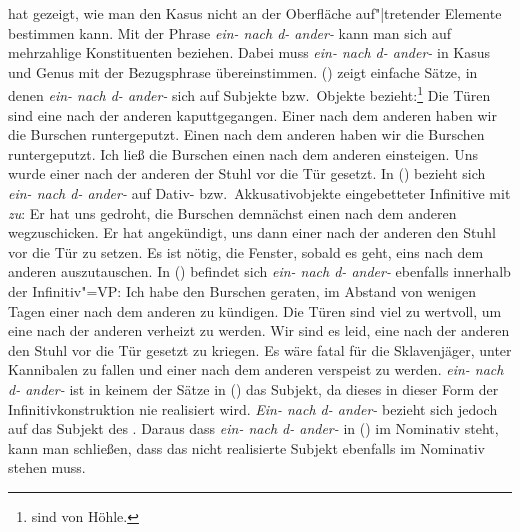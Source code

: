 \citet*[Kapitel~6]{Hoehle83a}
hat gezeigt, wie man den Kasus nicht an der Oberfläche
auf"|tretender Elemente bestimmen kann. Mit der Phrase \emph{ein- nach d- ander-} kann
man sich auf mehrzahlige Konstituenten beziehen. Dabei muss \emph{ein- nach d- ander-}
in Kasus und Genus mit der Bezugsphrase übereinstimmen.
() zeigt einfache Sätze, in denen \emph{ein- nach d- ander-} sich auf Subjekte bzw.\
Objekte bezieht:\footnote{
         sind von Höhle.
}
\eal
\label{bsp-tueren-hoehle}
\ex Die Türen sind eine nach der anderen kaputtgegangen.
\ex Einer nach dem anderen haben wir die Burschen runtergeputzt.
\ex Einen nach dem anderen haben wir die Burschen runtergeputzt.
\ex Ich ließ die Burschen einen nach dem anderen einsteigen.
\ex Uns wurde einer nach der anderen der Stuhl vor die Tür gesetzt.
\zl
In () bezieht sich \emph{ein- nach d- ander-} auf Dativ- bzw.\ Akkusativobjekte
eingebetteter Infinitive mit \emph{zu}:
\eal
\ex Er hat uns gedroht, die Burschen demnächst einen nach dem anderen wegzuschicken.
\ex Er hat angekündigt, uns dann einer nach der anderen den Stuhl vor die Tür zu setzen.
\ex Es ist nötig, die Fenster, sobald es geht, eins nach dem anderen auszutauschen.
\zl
In () befindet sich \emph{ein- nach d- ander-} ebenfalls innerhalb der Infinitiv"=VP:
\eal
\label{bsp-nominativ-inkoh}
\ex Ich habe den Burschen geraten, im Abstand von wenigen Tagen einer nach dem anderen
      zu kündigen.\label{bsp-nominativ-inkoh-geraten}
\ex Die Türen sind viel zu wertvoll, um eine nach der anderen verheizt zu werden.
\ex Wir sind es leid, eine nach der anderen den Stuhl vor die Tür gesetzt zu kriegen.
\ex Es wäre fatal für die Sklavenjäger, unter Kannibalen zu fallen und einer nach dem
      anderen verspeist zu werden.
\zl
\emph{ein- nach d- ander-} ist in keinem der Sätze in () das Subjekt,
da dieses in dieser Form der Infinitivkonstruktion nie realisiert wird. \emph{Ein- nach d- ander-} bezieht sich
jedoch auf das Subjekt des \zuis. Daraus dass \emph{ein- nach d- ander-} in (\mex{0}) im Nominativ
steht, kann man schließen, dass das nicht realisierte Subjekt ebenfalls im Nominativ
stehen muss.

